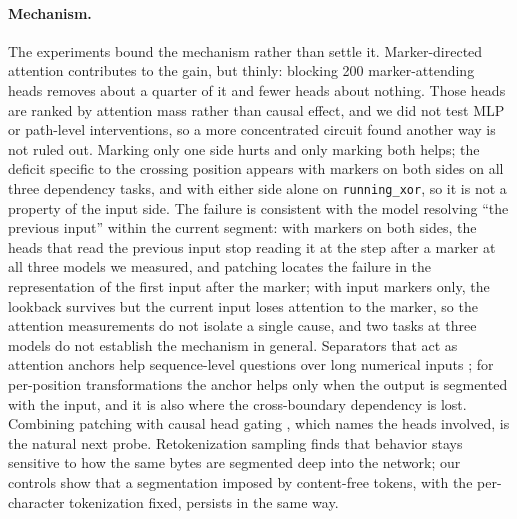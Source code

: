 \documentclass[10pt]{article} %
\newcommand{\task}[1]{\texttt{#1}}
\begin{document}
\paragraph{Mechanism.} The experiments bound the mechanism rather than settle it. Marker-directed attention contributes to the gain, but thinly: blocking 200 marker-attending heads removes about a quarter of it and fewer heads about nothing. Those heads are ranked by attention mass rather than causal effect, and we did not test MLP or path-level interventions, so a more concentrated circuit found another way is not ruled out. Marking only one side hurts and only marking both helps; the deficit specific to the crossing position appears with markers on both sides on all three dependency tasks, and with either side alone on \task{running\_xor}, so it is not a property of the input side. The failure is consistent with the model resolving ``the previous input'' within the current segment: with markers on both sides, the heads that read the previous input stop reading it at the step after a marker at all three models we measured, and patching locates the failure in the representation of the first input after the marker; with input markers only, the lookback survives but the current input loses attention to the marker, so the attention measurements do not isolate a single cause, and two tasks at three models do not establish the mechanism in general. Separators that act as attention anchors help sequence-level questions over long numerical inputs \citep{sun2026sepseq}; for per-position transformations the anchor helps only when the output is segmented with the input, and it is also where the cross-boundary dependency is lost. Combining patching with causal head gating \citep{nam2025headgating}, which names the heads involved, is the natural next probe. Retokenization sampling \citep{jain2026retokenization} finds that behavior stays sensitive to how the same bytes are segmented deep into the network; our controls show that a segmentation imposed by content-free tokens, with the per-character tokenization fixed, persists in the same way.
\end{document}
